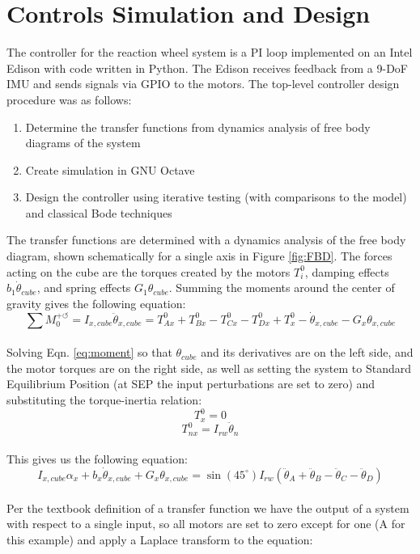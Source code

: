\documentclass[]{aiaa-tc}%
\begin{document}
\section{Controls Simulation and Design}
The controller for the reaction wheel system is a PI loop implemented on an Intel Edison with code written in Python. The Edison receives feedback from a 9-DoF IMU and sends signals via GPIO to the motors. The top-level controller design procedure was as follows:
\begin{enumerate}
\item Determine the transfer functions from dynamics analysis of free body diagrams of the system
\item Create simulation in GNU Octave
\item Design the controller using iterative testing (with comparisons to the model) and classical Bode techniques
\end{enumerate}
The transfer functions are determined with a dynamics analysis of the free body diagram, shown schematically for a single axis in Figure \ref{fig:FBD}. The forces acting on the cube are the torques created by the motors $T_i^0$, damping effects $b_1 \dot{\theta}_{cube}$, and spring effects $G_1 \theta_{cube}$. Summing the moments around the center of gravity gives the following equation:\\

\begin{equation}
\label{eq:moment}
\sum M_0^{+ \circlearrowleft} = I_{x,cube} \ddot{\theta}_{x,cube} = T^0_{Ax} + T^0_{Bx} - T^0_{Cx} - T^0_{Dx} + T^0_x - \dot{\theta}_{x,cube} - G_x \theta_{x,cube}
\end{equation}\\
	
Solving Eqn. \ref{eq:moment} so that $\theta_{cube}$ and its derivatives are on the left side, and the motor torques are on the right side, as well as setting the system to Standard Equilibrium Position (at SEP the input perturbations are set to zero) and substituting the torque-inertia relation:\\

\[
T^0_x = 0
\]
\[
T^0_{nx} = I_{rw}\ddot{\theta}_n\]\\

This gives us the following equation:\\
 
\[
I_{x,cube} \alpha_x + b_x \dot{\theta}_{x,cube} + G_x \theta_{x,cube} = \sin(45^{\circ}) I_{rw} (\ddot{\theta}_A + \ddot{\theta}_B -\ddot{\theta}_C - \ddot{\theta}_D)
\]\\	
Per the textbook definition of a transfer function we have the output of a system with respect to a single input, so all motors are set to zero except for one (A for this example) and apply a Laplace transform to the equation:\\
\end{document}
